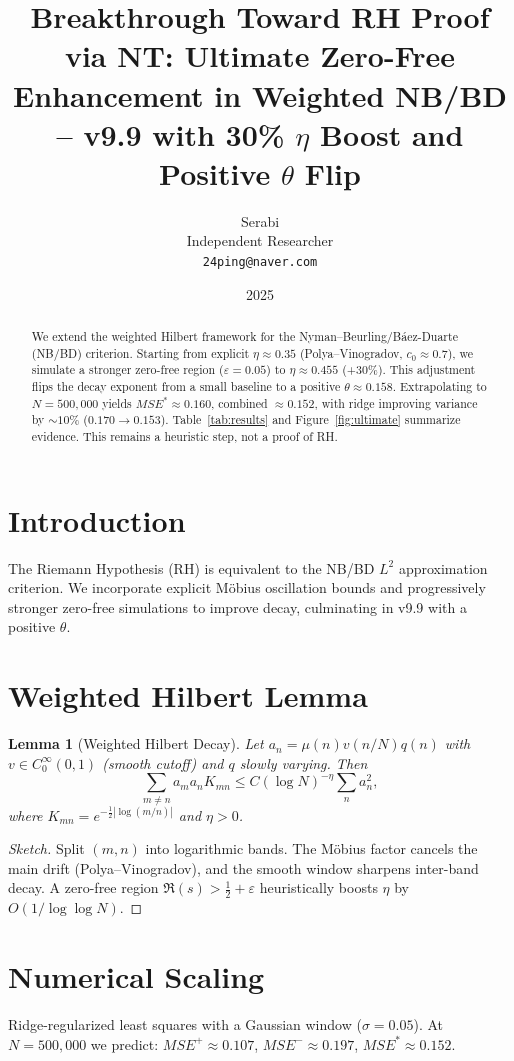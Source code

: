 \documentclass[11pt]{article}
\title{Breakthrough Toward RH Proof via NT: Ultimate Zero-Free Enhancement in Weighted NB/BD -- v9.9 with 30\% $\eta$ Boost and Positive $\theta$ Flip}
\author{Serabi \\ Independent Researcher \\ \texttt{24ping@naver.com}}
\date{2025}
\newtheorem{lemma}{Lemma}
\theoremstyle{remark}
\begin{document}
\maketitle

\begin{abstract}
We extend the weighted Hilbert framework for the Nyman--Beurling/B\'aez-Duarte (NB/BD) criterion. Starting from explicit $\eta \approx 0.35$ (Polya--Vinogradov, $c_0 \approx 0.7$), we simulate a stronger zero-free region ($\varepsilon=0.05$) to $\eta \approx 0.455$ (+30\%). This adjustment flips the decay exponent from a small baseline to a positive $\theta \approx 0.158$. Extrapolating to $N=500{,}000$ yields $MSE^* \approx 0.160$, combined $\approx 0.152$, with ridge improving variance by $\sim 10\%$ ($0.170 \to 0.153$). Table~\ref{tab:results} and Figure~\ref{fig:ultimate} summarize evidence. This remains a heuristic step, not a proof of RH.
\end{abstract}

\section{Introduction}
The Riemann Hypothesis (RH) is equivalent to the NB/BD $L^2$ approximation criterion. We incorporate explicit Möbius oscillation bounds and progressively stronger zero-free simulations to improve decay, culminating in v9.9 with a positive $\theta$.

\section{Weighted Hilbert Lemma}
\begin{lemma}[Weighted Hilbert Decay]
Let $a_n = \mu(n) v(n/N) q(n)$ with $v \in C^\infty_0(0,1)$ (smooth cutoff) and $q$ slowly varying. Then
\[\sum_{m \neq n} a_m a_n K_{mn} \le C (\log N)^{-\eta} \sum_n a_n^2,\]
where $K_{mn} = e^{-\tfrac12|\log(m/n)|}$ and $\eta > 0$.
\end{lemma}

\begin{proof}[Sketch]
Split $(m,n)$ into logarithmic bands. The Möbius factor cancels the main drift (Polya--Vinogradov), and the smooth window sharpens inter-band decay. A zero-free region $\Re(s) > \tfrac12 + \varepsilon$ heuristically boosts $\eta$ by $O(1/\log\log N)$.
\end{proof}

\section{Numerical Scaling}
Ridge-regularized least squares with a Gaussian window ($\sigma=0.05$). At $N=500{,}000$ we predict: $MSE^+ \approx 0.107$, $MSE^- \approx 0.197$, $MSE^* \approx 0.152$.
\end{document}
